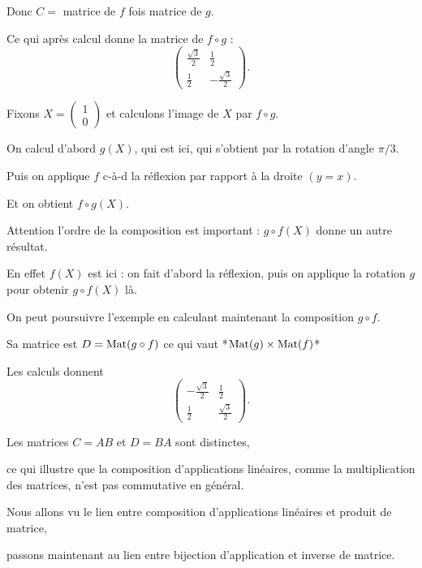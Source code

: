 Donc $C=$ matrice de $f$ fois matrice de $g$.

Ce qui après calcul donne la matrice de $f\circ g$ :
$$\begin{pmatrix} \frac{\sqrt3}{2} & \frac12  \\ \frac12 & -\frac{\sqrt3}{2}\end{pmatrix}.
$$



\diapo


Fixons $X=\left(\begin{smallmatrix}1\\0\end{smallmatrix} \right)$ et calculons l'image de $X$ par $f\circ g$.

On calcul d'abord $g(X)$, qui est ici, qui s'obtient par la rotation d'angle $\pi/3$.

Puis on applique $f$ c-à-d la réflexion par rapport à la droite $(y=x)$.

Et on obtient $f\circ g(X)$.


Attention l'ordre de la composition est important :
$g\circ f(X)$ donne un autre résultat.

En effet $f(X)$ est ici : on fait d'abord la réflexion, 
puis on applique la rotation $g$ pour obtenir $g\circ f(X)$ là.


\diapo

On peut poursuivre l'exemple en calculant maintenant la composition $g\circ f$.

Sa matrice est $D = \mathop{\mathrm{Mat}}\nolimits (g \circ f)$ ce qui vaut *$\mathop{\mathrm{Mat}}\nolimits (g) \times \mathop{\mathrm{Mat}}\nolimits (f)$*

\change
Les calculs donnent 
$$
\begin{pmatrix}-\frac{\sqrt3}{2} & \frac12 \\  \frac12 & \frac{\sqrt3}{2} \end{pmatrix}.
$$

\change
Les matrices $C=AB$ et $D=BA$ sont distinctes, 

\change
ce qui illustre que la 
composition d'applications linéaires, comme la multiplication des matrices, 
n'est pas commutative en général. 

\diapo

Nous allons vu le lien entre composition d'applications linéaires et produit de matrice,

passons maintenant au lien entre bijection d'application et inverse de matrice.

